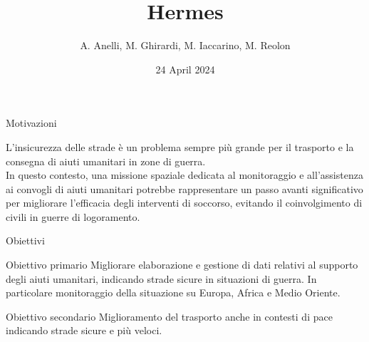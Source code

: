\documentclass[xcolor=table]{beamer}
\title{Hermes}
\author{A. Anelli, M. Ghirardi, M. Iaccarino, M. Reolon}
\date{24 April 2024}
\begin{document}
\begin{frame}
\titlepage
\end{frame}

\begin{frame}{Motivazioni }

\begin{block}{}
L'insicurezza delle strade è un problema sempre più grande per il trasporto e la consegna di aiuti umanitari in zone di guerra.\\
In questo contesto, una missione spaziale dedicata al monitoraggio e all'assistenza ai convogli di aiuti umanitari potrebbe rappresentare un passo avanti significativo per migliorare l'efficacia degli interventi di soccorso, evitando il coinvolgimento di civili in guerre di logoramento.

\end{block}
    
\end{frame}

\begin{frame}{Obiettivi}

\begin{block}{Obiettivo primario}
Migliorare elaborazione e gestione di dati relativi al supporto degli aiuti umanitari, indicando strade sicure in situazioni di guerra. In particolare monitoraggio della situazione su Europa, Africa e Medio Oriente.
        
\end{block}

\vspace{5mm}

\begin{block}{Obiettivo secondario}
Miglioramento del trasporto anche in contesti di pace indicando strade sicure e più veloci.  
\end{block}

\end{frame}
\end{document}
